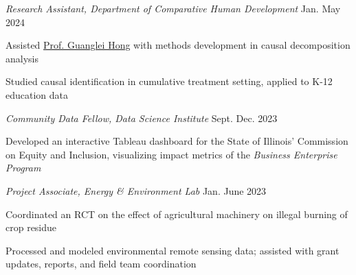 \documentclass[margin,line]{res}
\newenvironment{list1}{
  \begin{list}{\ding{113}}{%
      \setlength{\itemsep}{0in}
      \setlength{\parsep}{0in} \setlength{\parskip}{0in}
      \setlength{\topsep}{0in} \setlength{\partopsep}{0in} 
      \setlength{\leftmargin}{0.17in}}}{\end{list}}
\begin{document}
\begin{resume}
\vspace{-.3cm}
{\em Research Assistant, Department of Comparative Human Development} \hfill {Jan.{ \textemdash } May 2024} \\ 
\vspace{-.4cm}
\begin{list1}
\item[\cdot] Assisted \href{https://voices.uchicago.edu/ghong/}{Prof. Guanglei Hong} with methods development in causal decomposition analysis
\item[\cdot] Studied causal identification in cumulative treatment setting, applied to K-12 education data
\end{list1}

\vspace{-.3cm}
{\em Community Data Fellow, Data Science Institute} \hfill {Sept.{ \textemdash } Dec. 2023} \\ 
\vspace{-.4cm}
\begin{list1}
\item[\cdot] Developed an interactive Tableau dashboard for the State of Illinois' Commission on Equity and Inclusion, visualizing impact metrics of the {\em Business Enterprise Program}
\end{list1}

\vspace{-.3cm}
{\em Project Associate, Energy \& Environment Lab} \hfill {Jan.{ \textemdash } June 2023} \\ 
\vspace{-.4cm}
\begin{list1}
\item[\cdot] Coordinated an RCT on the effect of agricultural machinery on illegal burning of crop residue
\item[\cdot] Processed and modeled environmental remote sensing data; assisted with grant updates, reports, and field team coordination
\end{list1}





\end{resume}
\end{document}
